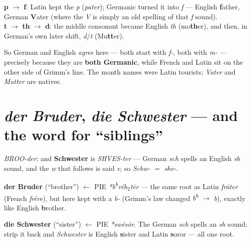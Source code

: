 \begin{etymology}
\textbf{p} $\to$ \textbf{f}: Latin kept the \emph{p} (\emph{pater}); Germanic
turned it into \emph{f} --- English \textbf{f}ather, German \textbf{V}ater
(where the \emph{V} is simply an old spelling of that \emph{f} sound).\\[3pt]
\textbf{t} $\to$ \textbf{th} $\to$ \textbf{d}: the middle consonant became
English \emph{th} (mo\textbf{th}er), and then, in German's own later shift,
\emph{d}/\emph{t} (Mu\textbf{tt}er).
\end{etymology}

\begin{culture}
So German and English \emph{agree} here --- both start with \emph{f-}, both
with \emph{m-} --- precisely because they are \textbf{both Germanic}, while
French and Latin sit on the other side of Grimm's line. The month names were
Latin tourists; \emph{Vater} and \emph{Mutter} are natives.
\end{culture}

\section[\emph{Bruder}, \emph{Schwester}, \emph{Geschwister}]{\emph{der Bruder}, \emph{die Schwester} --- and the word for ``siblings''}
\label{lesson:geschwister}

\begin{sounds}
\emph{BROO-der}; and \textbf{Schwester} is \emph{SHVES-ter} --- German
\emph{sch} spells an English \emph{sh} sound, and the \emph{w} that follows is
said \emph{v}, so \emph{Schw-} $=$ \emph{shv-}.
\end{sounds}

\begin{cousinweb}
\textbf{der Bruder} (``brother'') $\leftarrow$ PIE \emph{*b\textsuperscript{h}r\'{e}h$_2$t\=er} ---
the same root as Latin \emph{fr\=ater} (French \emph{fr\`{e}re}), but here kept
with a \emph{b-} (Grimm's law changed \emph{b\textsuperscript{h}} $\to$ \emph{b}),
exactly like English \textbf{b}rother.
\end{cousinweb}

\begin{cousinweb}
\textbf{die Schwester} (``sister'') $\leftarrow$ PIE \emph{*sw\'{e}s\=or}. The
German \emph{sch} spells an \emph{sh} sound; strip it back and
\emph{Schwester} is English \textbf{s}ister and Latin \textbf{s}oror --- all
one root.
\end{cousinweb}


